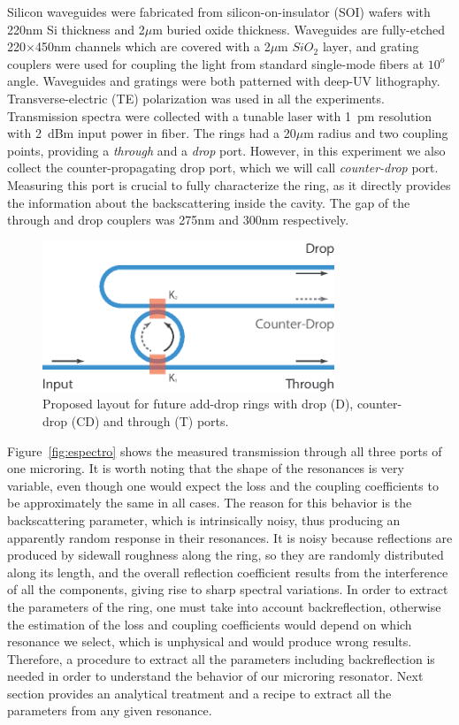 \documentclass[10pt,letterpaper]{article}
\begin{document}
Silicon waveguides were fabricated from silicon-on-insulator (SOI) wafers with 220nm Si thickness and 2$\mu$m buried oxide thickness. Waveguides are fully-etched 220$\times$450nm channels which are covered with a 2$\mu$m $SiO_2$ layer, and grating couplers were used for coupling the light from standard single-mode fibers at $10^o$ angle. Waveguides and gratings were both patterned with deep-UV lithography. Transverse-electric (TE) polarization was used in all the experiments. Transmission spectra were collected with a tunable laser with 1~pm resolution with 2~dBm input power in fiber. The rings had a 20$\mu$m radius and two coupling points, providing a \emph{through} and a  \emph{drop} port. However, in this experiment we also collect the counter-propagating drop port, which we will call \emph{counter-drop} port. Measuring this port is crucial to fully characterize the ring, as it directly provides the information about the backscattering inside the cavity. The gap of the through and drop couplers was 275nm and 300nm respectively. 
\begin{figure}
    \centering
    \includegraphics[height=4.5cm]{add_drop_ring.eps}
    \caption{Proposed layout for future add-drop rings with drop (D), counter-drop (CD) and through (T) ports.}
    \label{fig:add_drop_ring}
\end{figure}

Figure~\ref{fig:espectro} shows the measured transmission through all three ports of one microring. It is worth noting that the shape of the resonances is very variable, even though one would expect the loss and the coupling coefficients to be approximately the same in all cases. The reason for this behavior is the backscattering parameter, which is intrinsically noisy, thus producing an apparently random response in their resonances. It is noisy because reflections are produced by sidewall roughness along the ring, so they are randomly distributed along its length, and the overall reflection coefficient results from the interference of all the components, giving rise to sharp spectral variations. In order to extract the parameters of the ring, one must take into account backreflection, otherwise the estimation of the loss and coupling coefficients would depend on which resonance we select, which is unphysical and would produce wrong results. Therefore, a procedure to extract all the parameters including backreflection is needed in order to understand the behavior of our microring resonator. Next section provides an analytical treatment and a recipe to extract all the parameters from any given resonance.
\end{document}
